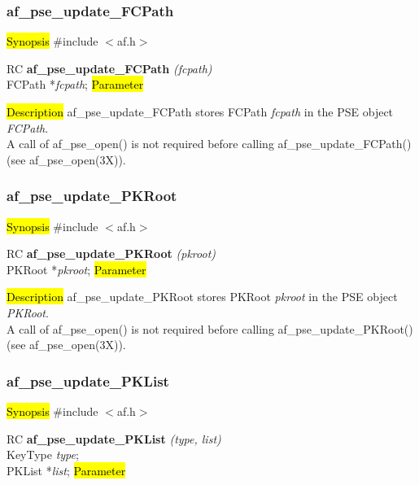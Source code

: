 \subsubsection{af\_pse\_update\_FCPath}
\label{af_update_FCPath}
\hl{Synopsis}
\#include $<$af.h$>$ 

RC {\bf af\_pse\_update\_FCPath} {\em (fcpath)} \\
FCPath *{\em fcpath};
\hl{Parameter}

\hl{Description}
af\_pse\_update\_FCPath stores FCPath {\em fcpath} in the PSE object
{\em FCPath}.
\\ [1em]
A call of af\_pse\_open() is not required before calling af\_pse\_update\_FCPath()
(see af\_pse\_open(3X)).

\subsubsection{af\_pse\_update\_PKRoot}
\label{af_update_PKRoot}

\hl{Synopsis}
\#include $<$af.h$>$ 

RC {\bf af\_pse\_update\_PKRoot} {\em (pkroot)} \\
PKRoot *{\em pkroot};
\hl{Parameter}


\hl{Description}
af\_pse\_update\_PKRoot stores PKRoot {\em pkroot} in the PSE object {\em PKRoot}.
\\ [1em]
A call of af\_pse\_open() is not required before calling af\_pse\_update\_PKRoot()
(see af\_pse\_open(3X)).

\subsubsection{af\_pse\_update\_PKList}
\label{af_pse_update_PKList}
\hl{Synopsis}
\#include $<$af.h$>$

RC {\bf af\_pse\_update\_PKList} {\em (type, list)} \\
KeyType {\em type}; \\
PKList *{\em list};
\hl{Parameter}

